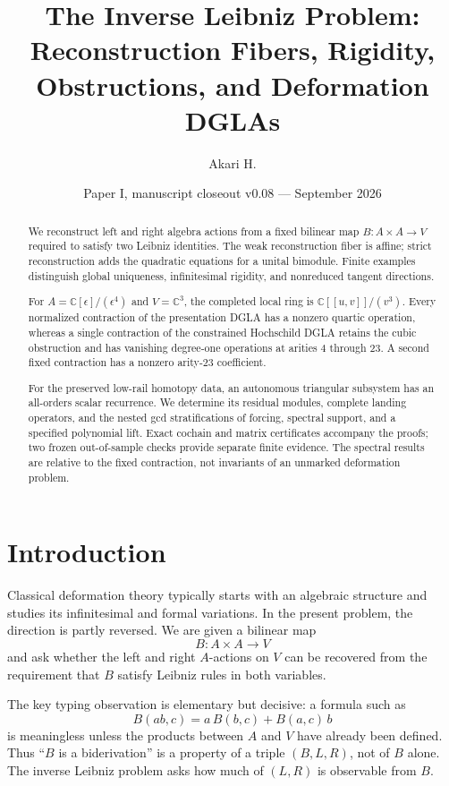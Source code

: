 \documentclass[11pt]{amsart}
\title[The Inverse Leibniz Problem]{The Inverse Leibniz Problem:\\Reconstruction Fibers, Rigidity, Obstructions, and Deformation DGLAs}
\author{Akari H.}
\date{Paper I, manuscript closeout v0.08 --- September 2026}
\newcommand{\C}{\mathbb C}
\begin{document}
\begin{abstract}
We reconstruct left and right algebra actions from a fixed bilinear map
$B:A\times A\to V$ required to satisfy two Leibniz identities.
The weak reconstruction fiber is affine; strict reconstruction adds the
quadratic equations for a unital bimodule. Finite examples distinguish
global uniqueness, infinitesimal rigidity, and nonreduced tangent directions.

For $A=\C[\epsilon]/(\epsilon^4)$ and $V=\C^3$, the completed local ring is
$\C[[u,v]]/(v^3)$. Every normalized contraction of the presentation DGLA
has a nonzero quartic operation, whereas a single contraction of the
constrained Hochschild DGLA retains the cubic obstruction and has
vanishing degree-one operations at arities $4$ through $23$.
A second fixed contraction has a nonzero arity-$23$ coefficient.

For the preserved low-rail homotopy data, an autonomous triangular subsystem
has an all-orders scalar recurrence. We determine its residual modules,
complete landing operators, and the nested gcd stratifications of forcing,
spectral support, and a specified polynomial lift.
Exact cochain and matrix certificates accompany the proofs; two frozen
out-of-sample checks provide separate finite evidence.
The spectral results are relative to the fixed contraction, not invariants
of an unmarked deformation problem.
\end{abstract}

\maketitle
\clearpage
\tableofcontents
\clearpage

\section{Introduction}

Classical deformation theory typically starts with an algebraic structure and studies its infinitesimal and formal variations.  In the present problem, the direction is partly reversed.  We are given a bilinear map
\[
B:A\times A\longrightarrow V
\]
and ask whether the left and right $A$-actions on $V$ can be recovered from the requirement that $B$ satisfy Leibniz rules in both variables.

The key typing observation is elementary but decisive: a formula such as
\[
B(ab,c)=a\,B(b,c)+B(a,c)\,b
\]
is meaningless unless the products between $A$ and $V$ have already been defined.  Thus ``$B$ is a biderivation'' is a property of a triple $(B,L,R)$, not of $B$ alone.  The inverse Leibniz problem asks how much of $(L,R)$ is observable from $B$.
\end{document}

